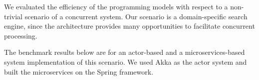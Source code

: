 \documentclass[final,hyperref={pdfpagelabels=true}]{beamer}
\begin{document}
\begin{frame}
\begin{columns}[t]
\begin{column}{.43\textwidth}
{\begin{justify}
        We evaluated the efficiency of the programming models with respect to a non-trivial scenario of a concurrent system. Our scenario is a domain-specific search engine, since the architecture provides many opportunities to facilitate concurrent processing. 

        \vspace*{.88\baselineskip}
        
        The benchmark results below are for an actor-based and a microservices-based system implementation of this scenario. We used Akka as the actor system and built the microservices on the Spring framework.
        \end{justify}
      }

      \renewcommand\sfdefault{lmss} %
      

\end{column}
\end{columns}
\end{frame}
\end{document}

